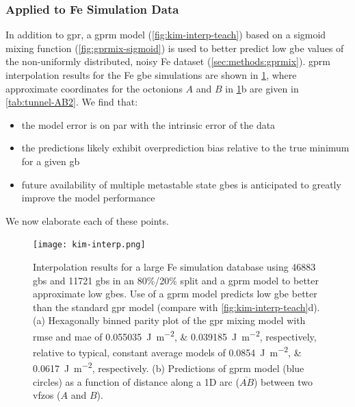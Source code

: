 \documentclass[final,twocolumn,12pt]{elsarticle}
\begin{document}
\subsubsection{ Applied to Fe Simulation Data}
\label{sec:results:simulation:gprm}
In addition to \gls{gpr}, a \gls{gprm} model (\cref{fig:kim-interp-teach}) based on a sigmoid mixing function (\cref{fig:gprmix-sigmoid}) is used to better predict low \gls{gbe} values of the non-uniformly distributed, noisy Fe dataset (\cref{sec:methods:gprmix}). \Gls{gprm} interpolation results for the Fe \gls{gbe} simulations \cite{kimPhasefieldModeling3D2014} are shown in \cref{fig:kim-interp}, where approximate coordinates for the octonions $A$ and $B$ in \cref{fig:kim-interp}b are given in \cref{tab:tunnel-AB2}. %
We find that:
\begin{itemize}
    \item the model error is on par with the intrinsic error of the data
    \item the predictions likely exhibit overprediction bias relative to the true minimum for a given \gls{gb}
    \item future availability of multiple metastable state \glspl{gbe} is anticipated to greatly improve the model performance
\end{itemize}
We now elaborate each of these points.

\begin{figure}
    \centering
    \texttt{[image: kim-interp.png]}
    \caption{Interpolation results for a large Fe simulation database \cite{kimPhasefieldModeling3D2014} using \num{46883} \inpt{} \glspl{gb} and \num{11721} \outpt{} \glspl{gb} in an 80\%/20\% split and a \gls{gprm} model to better approximate low \glspl{gbe}. Use of a \gls{gprm} model predicts low \gls{gbe} better than the standard \gls{gpr} model (compare with \cref{fig:kim-interp-teach}d). (a) Hexagonally binned parity plot of the \gls{gpr} mixing model with \gls{rmse} and \gls{mae} of \SIlist{0.055035;0.039185}{\J\per\square\meter}, respectively, relative to typical, constant average models of \SIlist{0.0854;0.0617}{\joule\per\square\meter}, respectively. (b) Predictions of \gls{gprm} model (blue circles) as a function of distance along a 1D arc ($\overline{AB}$) between two \glspl{vfzo} ($A$ and $B$). }
    \label{fig:kim-interp}
\end{figure}
\end{document}
